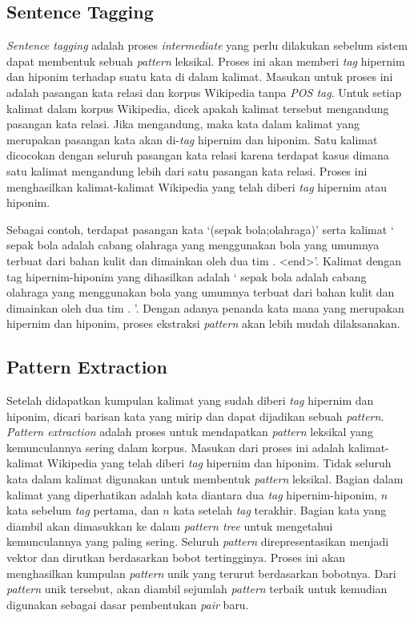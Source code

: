 \subsection{Sentence Tagging}
\textit{Sentence tagging} adalah proses \textit{intermediate} yang perlu dilakukan sebelum sistem dapat membentuk sebuah \textit{pattern} leksikal. Proses ini akan memberi \textit{tag} hipernim dan hiponim terhadap suatu kata di dalam kalimat. Masukan untuk proses ini adalah pasangan kata relasi dan korpus Wikipedia tanpa \textit{POS tag}. Untuk setiap kalimat dalam korpus Wikipedia, dicek apakah kalimat tersebut mengandung pasangan kata relasi. Jika mengandung, maka kata dalam kalimat yang merupakan pasangan kata akan di-\textit{tag} hipernim dan hiponim. Satu kalimat dicocokan dengan seluruh pasangan kata relasi karena terdapat kasus dimana satu kalimat mengandung lebih dari satu pasangan kata relasi. Proses ini menghasilkan kalimat-kalimat Wikipedia yang telah diberi \textit{tag} hipernim atau hiponim.

Sebagai contoh, terdapat pasangan kata `(sepak bola;olahraga)' serta kalimat `{\tagStart} sepak bola adalah cabang olahraga yang menggunakan bola yang umumnya terbuat dari bahan kulit dan dimainkan oleh dua tim . {\selectfont<end>}'. Kalimat dengan tag hipernim-hiponim yang dihasilkan adalah `{\tagStart} {\tagHyponym}sepak bola{\tagHyponym} adalah cabang {\tagHypernym}olahraga{\tagHypernym} yang menggunakan bola yang umumnya terbuat dari bahan kulit dan dimainkan oleh dua tim . {\tagEnd}'. Dengan adanya penanda kata mana yang merupakan hipernim dan hiponim, proses ekstraksi \textit{pattern} akan lebih mudah dilaksanakan.

\subsection{Pattern Extraction}
Setelah didapatkan kumpulan kalimat yang sudah diberi \textit{tag} hipernim dan hiponim, dicari barisan kata yang mirip dan dapat dijadikan sebuah \textit{pattern}. \textit{Pattern extraction} adalah proses untuk mendapatkan \textit{pattern} leksikal yang kemunculannya sering dalam korpus. Masukan dari proses ini adalah kalimat-kalimat Wikipedia yang telah diberi \textit{tag} hipernim dan hiponim. Tidak seluruh kata dalam kalimat digunakan untuk membentuk \textit{pattern} leksikal. Bagian dalam kalimat yang diperhatikan adalah kata diantara dua \textit{tag} hipernim-hiponim, $n$ kata sebelum \textit{tag} pertama, dan $n$ kata setelah \textit{tag} terakhir. Bagian kata yang diambil akan dimasukkan ke dalam \textit{pattern tree} untuk mengetahui kemunculannya yang paling sering. Seluruh \textit{pattern} direpresentasikan menjadi vektor dan dirutkan berdasarkan bobot tertingginya. Proses ini akan menghasilkan kumpulan \textit{pattern} unik yang terurut berdasarkan bobotnya. Dari \textit{pattern} unik tersebut, akan diambil sejumlah \textit{pattern} terbaik untuk kemudian digunakan sebagai dasar pembentukan \textit{pair} baru.

